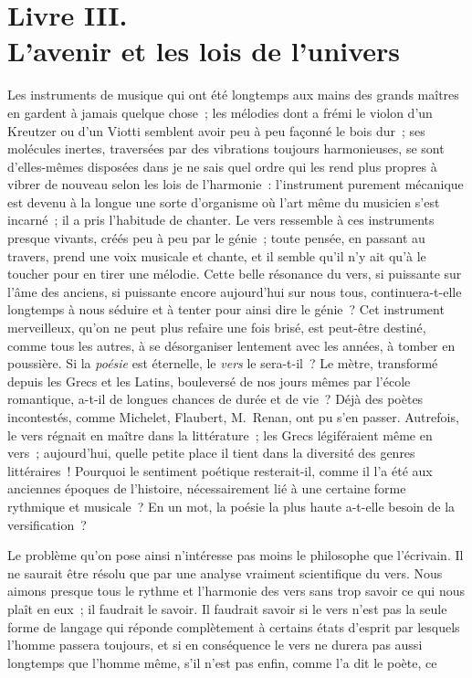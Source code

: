 \documentclass[french,twoside]{book} %
\begin{document}
\section[{Livre III. L’avenir et les lois de l’univers}]{Livre III. \\
L’avenir et les lois de l’univers}\renewcommand{\leftmark}{Livre III. \\
L’avenir et les lois de l’univers}

\noindent  Les instruments de musique qui ont été longtemps aux mains des grands maîtres en gardent à jamais quelque chose ; les mélodies dont a frémi le violon d’un Kreutzer ou d’un Viotti semblent avoir peu à peu façonné le bois dur ; ses molécules inertes, traversées par des vibrations toujours harmonieuses, se sont d’elles-mêmes disposées dans je ne sais quel ordre qui les rend plus propres à vibrer de nouveau selon les lois de l’harmonie : l’instrument purement mécanique est devenu à la longue une sorte d’organisme où l’art même du musicien s’est incarné ; il a pris l’habitude de chanter. Le vers ressemble à ces instruments presque vivants, créés peu à peu par le génie ; toute pensée, en passant au travers, prend une voix musicale et chante, et il semble qu’il n’y ait qu’à le toucher pour en tirer une mélodie. Cette belle résonance du vers, si puissante sur l’âme des anciens, si puissante encore aujourd’hui sur nous tous, continuera-t-elle longtemps à nous séduire et à tenter pour ainsi dire le génie ? Cet instrument merveilleux, qu’on ne peut plus refaire une fois brisé, est peut-être  destiné, comme tous les autres, à se désorganiser lentement avec les années, à tomber en poussière. Si la \emph{poésie} est éternelle, le \emph{vers} le sera-t-il ? Le mètre, transformé depuis les Grecs et les Latins, bouleversé de nos jours mêmes par l’école romantique, a-t-il de longues chances de durée et de vie ? Déjà des poètes incontestés, comme Michelet, Flaubert, M. Renan, ont pu s’en passer. Autrefois, le vers régnait en maître dans la littérature ; les Grecs légiféraient même en vers ; aujourd’hui, quelle petite place il tient dans la diversité des genres littéraires ! Pourquoi le sentiment poétique resterait-il, comme il l’a été aux anciennes époques de l’histoire, nécessairement lié à une certaine forme rythmique et musicale ? En un mot, la poésie la plus haute a-t-elle besoin de la versification ?\par
Le problème qu’on pose ainsi n’intéresse pas moins le philosophe que l’écrivain. Il ne saurait être résolu que par une analyse vraiment scientifique du vers. Nous aimons presque tous le rythme et l’harmonie des vers sans trop savoir ce qui nous plaît en eux ; il faudrait le savoir. Il faudrait savoir si le vers n’est pas la seule forme de langage qui réponde complètement à certains états d’esprit par lesquels l’homme passera toujours, et si en conséquence le vers ne durera pas aussi longtemps que l’homme même, s’il n’est pas enfin, comme l’a dit le poète, ce\par
\end{document}

